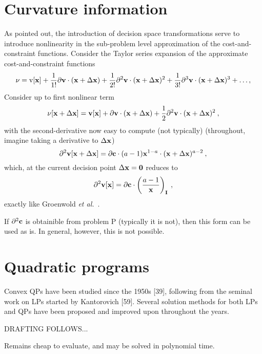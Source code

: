 \documentclass[11pt]{article}
\begin{document}
\section{Curvature information}
As pointed out, the introduction of decision space transformations serve to introduce nonlinearity in the sub-problem level approximation of the cost-and-constraint functions. Consider the Taylor series expansion of the approximate cost-and-constraint functions 
\begin{equation}
\mathbf{\nu} = \textrm{v}[\mathbf{x}] + \frac{1}{1!}\partial \mathbf{v} \cdot (\mathbf{x} + \Delta \mathbf{x}) + \frac{1}{2!}\partial^2 \mathbf{v} \cdot (\mathbf{x} + \Delta \mathbf{x})^2 + \frac{1}{3!}\partial^3 \mathbf{v} \cdot (\mathbf{x} + \Delta \mathbf{x})^3 + \ldots ,
\end{equation}
Consider up to first nonlinear term
\begin{equation}
\mathbf{\nu}[\mathbf{x} + \Delta \mathbf{x}] = \mathbf{v}[\mathbf{x}] + \partial \mathbf{v} \cdot (\mathbf{x} + \Delta \mathbf{x}) + \frac{1}{2}\partial^2 \mathbf{v} \cdot (\mathbf{x} + \Delta \mathbf{x})^2 \: , 
\end{equation}
with the second-derivative now easy to compute (not typically) (throughout, imagine taking a derivative to $\Delta \mathbf{x}$)
\begin{equation}
\partial^2 \mathbf{v}[\mathbf{x} + \Delta \mathbf{x}] = \partial \mathbf{c} \cdot (a-1)\mathbf{x}^{1-a} \cdot (\mathbf{x}+\Delta\mathbf{x})^{a-2} \: ,
\end{equation}
which, at the current decision point $\Delta \mathbf{x} = \mathbf{0}$ reduces to
\begin{equation}
\partial^2 \mathbf{v}[\mathbf{x}] = \partial \mathbf{c} \cdot \left(\frac{a-1}{\mathbf{x}}\right)_{\mathbf{I}} \: ,
\end{equation}
exactly like Groenwold \emph{et al.}~\cite{groenwold2010approximated}.

If $\partial^2 \mathbf{c}$ is obtainible from problem P (typically it is not), then this form can be used as is. In general, however, this is not possible.  

\section{Quadratic programs}
\cite{osqp} 

Convex QPs have been studied since the 1950s [39], following from the seminal work
on LPs started by Kantorovich [59]. Several solution methods for both LPs and QPs
have been proposed and improved upon throughout the years.
\bigskip

DRAFTING FOLLOWS...

\bigskip

Remains cheap to evaluate, and may be solved in polynomial time.
\end{document}
